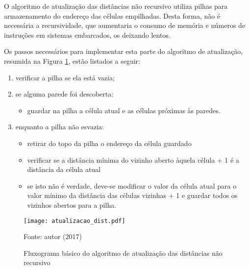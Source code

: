O algoritmo de atualização das distâncias não recursivo utiliza pilhas para armazenamento do endereço das células empilhadas. Desta forma, não é necessária a recursividade, que aumentaria o consumo de memória e números de instruções em sistemas embarcados, os deixando lentos.


Os passos necessários para implementar esta parte do algoritmo de atualização, resumida na Figura \ref{fig:diagram3}, estão listados a seguir:

\begin{enumerate}[leftmargin=2cm,label=\alph*)]
\item verificar a pilha se ela está vazia;
\item se alguma parede foi descoberta:
	\begin{itemize}[label={--}]
		\item guardar na pilha a célula atual e as células próximas às paredes.
	\end{itemize}
\item enquanto a pilha não esvazia:
	\begin{itemize}[label={--}]
		\item retirar do topo da pilha o endereço da célula guardado
		\item verificar se a distância mínima do vizinho aberto àquela célula + 1 é a distância da célula atual
		\item se isto não é verdade, deve-se modificar o valor da célula atual para o valor mínimo da distância das células vizinhas + 1 e guardar todos os vizinhos abertos para a pilha.
	\end{itemize}
\end{enumerate}

\begin{figure}[!htb]
	\caption{\label{fig:diagram3}Fluxograma básico do algoritmo de atualização das distâncias não recursivo}
	\begin{center}
		\texttt{[image: atualizacao\_dist.pdf]}
	\end{center}
	\centering
	\small Fonte: autor (2017)
\end{figure}

%

